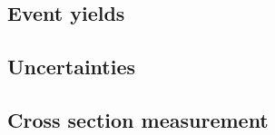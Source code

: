 \subsection{Event yields}\label{ssww:upgrade_yields}

\subsection{Uncertainties}\label{ssww:upgrade_uncertainties}

\subsection{Cross section measurement}\label{ssww:upgrade_xsec}
